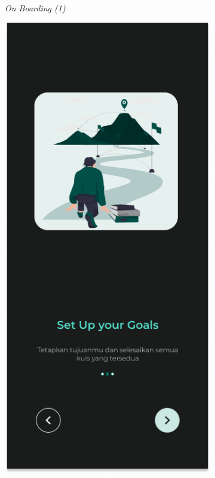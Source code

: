 \begin{figure}[H]
\begin{subfigure}[b]{0.23\textwidth}
	  \caption{\textit{On Boarding (1)}}
	  \label{fig:HasilBoarding1-dt}
	\end{subfigure}
	\begin{subfigure}[b]{0.23\textwidth}
		\centering
	  \includegraphics[width=\linewidth]{contents/chapter-3/images/HF-Boarding-2-dt.png}

\end{subfigure}
\end{figure}

